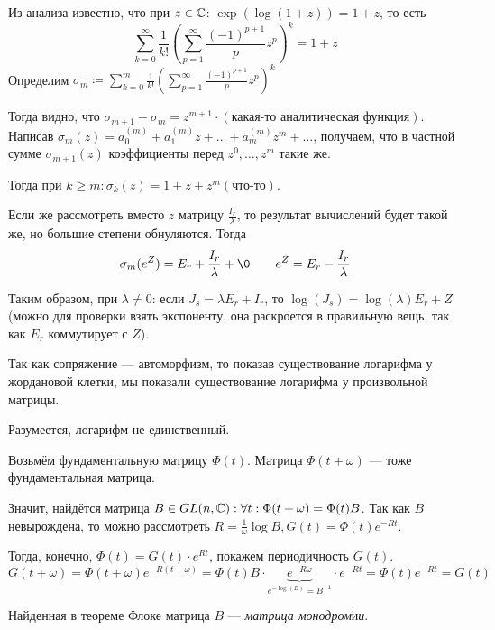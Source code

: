 \documentclass[a4paper]{report}
\begin{document}
{{{{{                        Из анализа известно, что при $z \in \mathbb{C}$: $\exp(\log(1 + z)) = 1 + z$, то есть
                        \[\sum\limits_{k = 0}^{\infty}\frac{1}{k!}\left(\sum\limits_{p = 1}^{\infty}\frac{(-1)^{p + 1}}p z^p\right)^k = 1 + z\]
                        Определим $\sigma_m \coloneqq \sum\limits_{k = 0}^{m}\frac{1}{k!}\left(\sum\limits_{p = 1}^{\infty}\frac{(-1)^{p + 1}}p z^p\right)^k$

                        Тогда видно, что $\sigma_{m + 1} - \sigma_m = z^{m+1} \cdot (\text{какая-то аналитическая функция})$.
                        Написав $\sigma_m(z) = a_0^{(m)} + a_1^{(m)}z + \dots + a_m^{(m)}z^m + \dots$, получаем, что в частной сумме $\sigma_{m + 1}(z)$ коэффициенты перед $z^0, \dots, z^m$ такие же.

                        Тогда при $k \ge m: \sigma_k(z) = 1 + z + z^m(\text{что-то})$.

                        Если же рассмотреть вместо $z$ матрицу $\frac{I_r}{\lambda}$, то результат вычислений будет такой же, но большие степени обнуляются.
                        Тогда \[\sigma_m(e^Z) = E_r + \frac{I_r}{\lambda} + \0\qquad e^Z = E_r - \frac{I_r}{\lambda}\]
                    }

                    Таким образом, при $\lambda \ne 0$: если $J_s = \lambda E_r + I_r$, то $\log(J_s) = \log(\lambda) E_r + Z$ (можно для проверки взять экспоненту, она раскроется в правильную вещь, так как $E_r$ коммутирует с $Z$).

                    Так как сопряжение --- автоморфизм, то показав существование логарифма у жордановой клетки, мы показали существование логарифма у произвольной матрицы.

                    Разумеется, логарифм не единственный.
                }
            }
            Возьмём фундаментальную матрицу $\Phi(t)$.
            Матрица $\Phi(t + \omega)$ --- тоже фундаментальная матрица.

            Значит, найдётся матрица $B \in GL(n, \mathbb{C}): \forall t: \Phi(t + \omega) = \Phi(t)B$.
            Так как $B$ невырождена, то можно рассмотреть $R = \frac{1}{\omega}\log B, G(t) = \Phi(t)e^{-Rt}$.

            Тогда, конечно, $\Phi(t) = G(t) \cdot e^{Rt}$, покажем периодичность $G(t)$.
            \[G(t + \omega) = \Phi(t + \omega)e^{-R(t + \omega)} = \Phi(t)B \cdot \underbrace{e^{-R\omega}}_{e^{-\log(B)} = B^{-1}} \cdot e^{-R t} = \Phi(t)e^{-Rt} = G(t)\]
        }
    }
    Найденная в теореме Флоке матрица $B$ --- \emph{матрица монодром$\acute{\text{и}}$и}.
\end{document}
